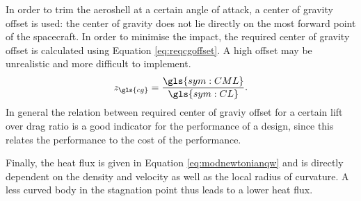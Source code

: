 In order to trim the aeroshell at a certain angle of attack, a center of gravity offset is used: the center of gravity does not lie directly on the most forward point of the spacecraft. In order to minimise the impact, the required center of gravity offset is calculated using Equation \ref{eq:reqcgoffset}. A high offset may be unrealistic and more difficult to implement.
\begin{equation} \label{eq:reqcgoffset}
z_{\gls{cg}} = \frac{\gls{sym:CML}}{\gls{sym:CL}}.
\end{equation}
In general the relation between required center of graviy offset for a certain lift over drag ratio is a good indicator for the performance of a design, since this relates the performance to the cost of the performance.

Finally, the heat flux is given in Equation \ref{eq:modnewtonianqw} and is directly dependent on the density and velocity as well as the local radius of curvature. A less curved body in the stagnation point thus leads to a lower heat flux.


